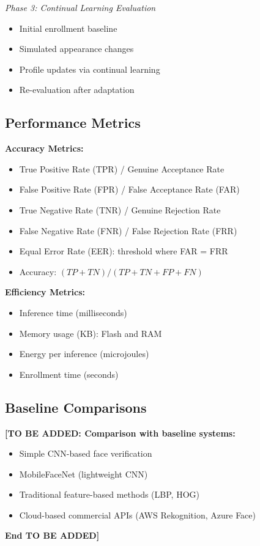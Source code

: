 \documentclass[a4paper,12pt]{article}
\begin{document}
\textit{Phase 3: Continual Learning Evaluation}
\begin{itemize}
    \item Initial enrollment baseline
    \item Simulated appearance changes
    \item Profile updates via continual learning
    \item Re-evaluation after adaptation
\end{itemize}

\subsection{Performance Metrics}

\textbf{Accuracy Metrics:}
\begin{itemize}
    \item True Positive Rate (TPR) / Genuine Acceptance Rate
    \item False Positive Rate (FPR) / False Acceptance Rate (FAR)
    \item True Negative Rate (TNR) / Genuine Rejection Rate
    \item False Negative Rate (FNR) / False Rejection Rate (FRR)
    \item Equal Error Rate (EER): threshold where FAR = FRR
    \item Accuracy: $(TP + TN) / (TP + TN + FP + FN)$
\end{itemize}

\textbf{Efficiency Metrics:}
\begin{itemize}
    \item Inference time (milliseconds)
    \item Memory usage (KB): Flash and RAM
    \item Energy per inference (microjoules)
    \item Enrollment time (seconds)
\end{itemize}

\subsection{Baseline Comparisons}

\textbf{[TO BE ADDED: Comparison with baseline systems:}
\begin{itemize}
    \item Simple CNN-based face verification
    \item MobileFaceNet (lightweight CNN)
    \item Traditional feature-based methods (LBP, HOG)
    \item Cloud-based commercial APIs (AWS Rekognition, Azure Face)
\end{itemize}
\textbf{End TO BE ADDED]}
\end{document}
